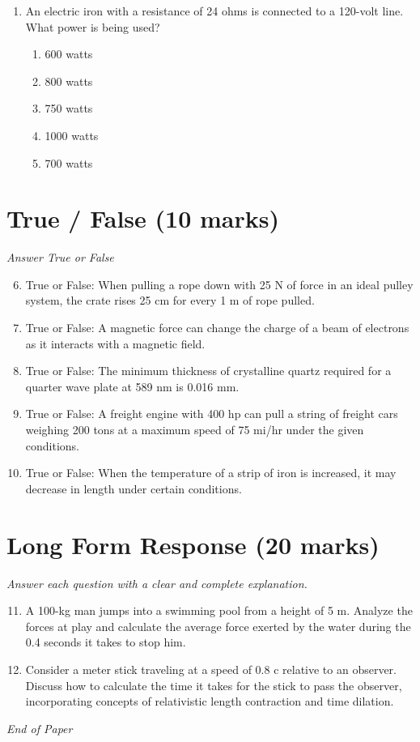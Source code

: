 \documentclass[12pt]{article}
\begin{document}
\begin{enumerate}[label=\arabic*.]
\begin{enumerate}[label=(\alph*)]
    \item reflection
    \item interference
\end{enumerate}
\item An electric iron with a resistance of 24 ohms is connected to a 120-volt line. What power is being used?
\begin{enumerate}[label=(\alph*)]
    \item 600 watts
    \item 800 watts
    \item 750 watts
    \item 1000 watts
    \item 700 watts
\end{enumerate}
\end{enumerate}

\section*{True / False (10 marks)}
\textit{Answer True or False}
\begin{enumerate}[label=\arabic*.]
\setcounter{enumi}{5}
\item True or False: When pulling a rope down with 25 N of force in an ideal pulley system, the crate rises 25 cm for every 1 m of rope pulled.
\item True or False: A magnetic force can change the charge of a beam of electrons as it interacts with a magnetic field.
\item True or False: The minimum thickness of crystalline quartz required for a quarter wave plate at 589 nm is 0.016 mm.
\item True or False: A freight engine with 400 hp can pull a string of freight cars weighing 200 tons at a maximum speed of 75 mi/hr under the given conditions.
\item True or False: When the temperature of a strip of iron is increased, it may decrease in length under certain conditions.
\end{enumerate}

\section*{Long Form Response (20 marks)}
\textit{Answer each question with a clear and complete explanation.}
\begin{enumerate}[label=\arabic*.]
\setcounter{enumi}{10}
\item A 100-kg man jumps into a swimming pool from a height of 5 m. Analyze the forces at play and calculate the average force exerted by the water during the 0.4 seconds it takes to stop him.
\item Consider a meter stick traveling at a speed of 0.8 c relative to an observer. Discuss how to calculate the time it takes for the stick to pass the observer, incorporating concepts of relativistic length contraction and time dilation.
\end{enumerate}

\vfill
\noindent\textit{End of Paper}
\end{document}
